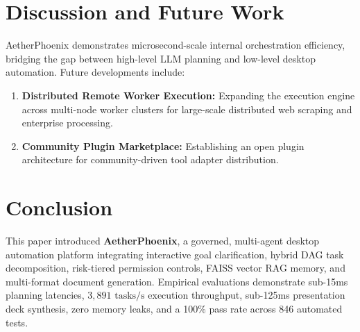 \documentclass[conference]{IEEEtran}
\begin{document}
\section{Discussion and Future Work}
\label{sec:discussion}

AetherPhoenix demonstrates microsecond-scale internal orchestration efficiency, bridging the gap between high-level LLM planning and low-level desktop automation. Future developments include:
\begin{enumerate}
    \item \textbf{Distributed Remote Worker Execution:} Expanding the execution engine across multi-node worker clusters for large-scale distributed web scraping and enterprise processing.
    \item \textbf{Community Plugin Marketplace:} Establishing an open plugin architecture for community-driven tool adapter distribution.
\end{enumerate}

\section{Conclusion}
\label{sec:conclusion}

This paper introduced \textbf{AetherPhoenix}, a governed, multi-agent desktop automation platform integrating interactive goal clarification, hybrid DAG task decomposition, risk-tiered permission controls, FAISS vector RAG memory, and multi-format document generation. Empirical evaluations demonstrate sub-15ms planning latencies, $3,891\text{ tasks/s}$ execution throughput, sub-125ms presentation deck synthesis, zero memory leaks, and a 100\% pass rate across 846 automated tests.
\end{document}
